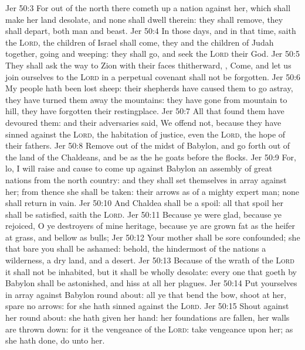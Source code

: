 \vs Jer 50:3 For out of the north there cometh up a nation against her, which shall make her land desolate, and none shall dwell therein: they shall remove, they shall depart, both man and beast.
\vs Jer 50:4 In those days, and in that time, saith the \textsc{Lord}, the children of Israel shall come, they and the children of Judah together, going and weeping: they shall go, and seek the \textsc{Lord} their God.
\vs Jer 50:5 They shall ask the way to Zion with their faces thitherward, , Come, and let us join ourselves to the \textsc{Lord} in a perpetual covenant  shall not be forgotten.
\vs Jer 50:6 My people hath been lost sheep: their shepherds have caused them to go astray, they have turned them away  the mountains: they have gone from mountain to hill, they have forgotten their restingplace.
\vs Jer 50:7 All that found them have devoured them: and their adversaries said, We offend not, because they have sinned against the \textsc{Lord}, the habitation of justice, even the \textsc{Lord}, the hope of their fathers.
\vs Jer 50:8 Remove out of the midst of Babylon, and go forth out of the land of the Chaldeans, and be as the he goats before the flocks.
\vs Jer 50:9 For, lo, I will raise and cause to come up against Babylon an assembly of great nations from the north country: and they shall set themselves in array against her; from thence she shall be taken: their arrows  as of a mighty expert man; none shall return in vain.
\vs Jer 50:10 And Chaldea shall be a spoil: all that spoil her shall be satisfied, saith the \textsc{Lord}.
\vs Jer 50:11 Because ye were glad, because ye rejoiced, O ye destroyers of mine heritage, because ye are grown fat as the heifer at grass, and bellow as bulls;
\vs Jer 50:12 Your mother shall be sore confounded; she that bare you shall be ashamed: behold, the hindermost of the nations  a wilderness, a dry land, and a desert.
\vs Jer 50:13 Because of the wrath of the \textsc{Lord} it shall not be inhabited, but it shall be wholly desolate: every one that goeth by Babylon shall be astonished, and hiss at all her plagues.
\vs Jer 50:14 Put yourselves in array against Babylon round about: all ye that bend the bow, shoot at her, spare no arrows: for she hath sinned against the \textsc{Lord}.
\vs Jer 50:15 Shout against her round about: she hath given her hand: her foundations are fallen, her walls are thrown down: for it  the vengeance of the \textsc{Lord}: take vengeance upon her; as she hath done, do unto her.
